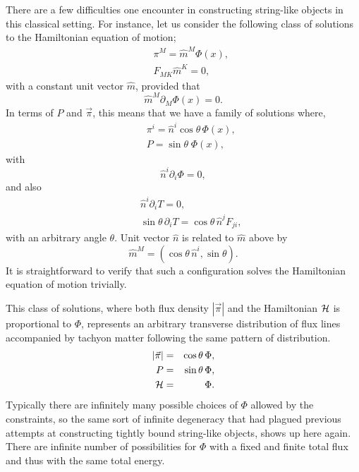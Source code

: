 \documentclass[a4paper,12pt]{article}
\newcommand{\p}{\partial}
\begin{document}
There are a few difficulties one encounter in constructing string-like
objects in this classical setting. For instance, let us consider the
following class of solutions to the Hamiltonian equation of motion;
\begin{eqnarray}
&&\pi^M=\hat m^M \Phi(x) , \nonumber\\
&&F_{MK}\hat m^K=0 ,
\end{eqnarray}
with a constant unit vector $\hat m$, provided that
\begin{equation}
\hat m^M\partial_M \Phi(x) =0.
\end{equation}
In terms of $P$ and $\vec \pi$, this means that we have
a family of solutions where,
\begin{eqnarray}
&&\pi^i=\hat n^i \cos\theta \,\Phi(x) ,\nonumber\\
&&P=  \sin\theta \;\Phi(x) ,
\end{eqnarray}
with 
\begin{equation}
\hat n^i\p_i\Phi=0 ,
\end{equation}
and also 
\begin{eqnarray}
&&\hat n^i\p_i T=0 , \nonumber \\
&&\sin\theta\,\p_i T= \cos\theta\,\hat n^j F_{ji} ,
\end{eqnarray}
with an arbitrary angle $\theta$. Unit vector $\hat n$ is related to
$\hat m$ above by
\begin{equation}
\hat m^M =(\cos\theta\,\hat n^i, \sin\theta ).
\end{equation}
It is straightforward to verify that such a configuration solves the
Hamiltonian equation of motion trivially.


This class of solutions, where both flux density $|\vec \pi|$
and the Hamiltonian $\cal H$ is proportional to $\Phi$, 
represents an arbitrary transverse distribution of flux lines 
accompanied by tachyon matter following the same pattern of 
distribution.
\begin{eqnarray}
|\vec \pi| &=& \cos\theta\,\Phi , \nonumber \\
P &=& \sin\theta\,\Phi ,\nonumber \\
{\cal H}&=& \Phi .
\end{eqnarray}
Typically there are  infinitely many  possible choices of $\Phi$ allowed
by 
the constraints, so the same sort of infinite degeneracy that had 
plagued previous attempts at constructing tightly bound string-like 
objects, shows up here again. There are infinite number of
possibilities for $\Phi$ with a fixed and finite total flux
and thus with the same total energy.
\end{document}
